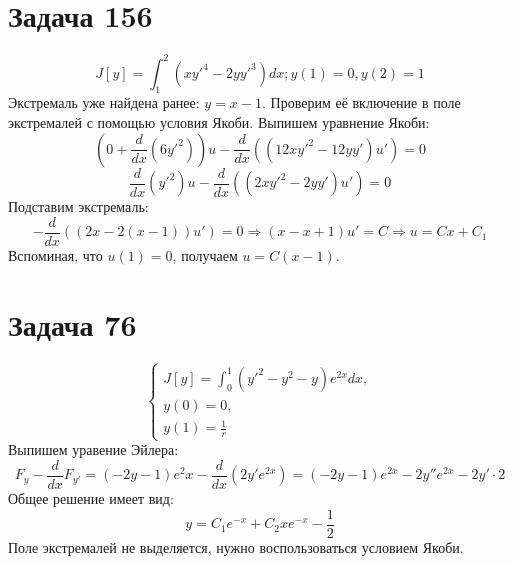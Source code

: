 \documentclass[11pt]{article}
\begin{document}
\section{Задача 156}
\label{sec:org3066fab}
$$J[y] = \int_1^2(xy'^4 - 2yy'^3)dx; y(1) = 0, y(2) = 1$$
Экстремаль уже найдена ранее: \(y = x - 1\). Проверим её включение в поле экстремалей с помощью условия Якоби.
Выпишем уравнение Якоби:
$$(0 + \frac{d}{dx}(6y'^2))u - \frac{d}{dx}((12xy'^2 - 12yy')u') = 0$$
$$\frac{d}{dx}(y'^2)u - \frac{d}{dx}((2xy'^2 - 2yy')u') = 0$$
Подставим экстремаль:
$$-\frac{d}{dx}((2x - 2(x - 1))u') = 0 \Rightarrow (x - x + 1)u' = C \Rightarrow u = Cx + C_1$$
Вспоминая, что \(u(1) = 0\), получаем \(u = C(x - 1)\).
\section{Задача 76}
\label{sec:org8828a7a}
\begin{equation*}
\begin{cases}
J[y] = \int_0^1(y'^2 - y^2 - y)e^{2x}dx, \\
y(0) = 0, \\
y(1) = \frac{1}r
\end{cases}
\end{equation*}
Выпишем уравение Эйлера:
$$F_y - \frac{d}{dx}F_{y'} = (-2y - 1)e^2x - \frac{d}{dx}(2y'e^{2x}) = (-2y - 1)e^{2x} - 2y''e^{2x} - 2y'\cdot2$$
Общее решение имеет вид:
$$y = C_1e^{-x} + C_2xe^{-x} - \frac{1}2$$
Поле экстремалей не выделяется, нужно воспользоваться условием Якоби.
\end{document}
